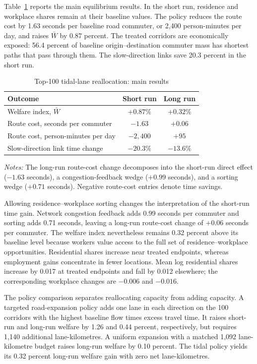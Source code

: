 \documentclass[12pt]{article}
\begin{document}
Table~\ref{tab:tidal} reports the main equilibrium results. In the short run, residence and workplace shares remain at their baseline values. The policy reduces the route cost by 1.63 seconds per baseline road commuter, or 2,400 person-minutes per day, and raises $\bar W$ by 0.87 percent. The treated corridors are economically exposed: 56.4 percent of baseline origin--destination commuter mass has shortest paths that pass through them. The slow-direction links save 20.3 percent in the short run.

\begin{table}[htbp]
\centering
\caption{Top-100 tidal-lane reallocation: main results}
\label{tab:tidal}
\begin{tabular}{lcc}
\toprule
Outcome & Short run & Long run \\
\midrule
Welfare index, $\bar W$ & $+0.87\%$ & $+0.32\%$ \\
Route cost, seconds per commuter & $-1.63$ & $+0.06$ \\
Route cost, person-minutes per day & $-2{,}400$ & $+95$ \\
Slow-direction link time change & $-20.3\%$ & $-13.6\%$ \\
\bottomrule
\end{tabular}
\begin{flushleft}\footnotesize
\emph{Notes:} The long-run route-cost change decomposes into the short-run direct effect ($-1.63$ seconds), a congestion-feedback wedge ($+0.99$ seconds), and a sorting wedge ($+0.71$ seconds). Negative route-cost entries denote time savings.
\end{flushleft}
\end{table}

Allowing residence--workplace sorting changes the interpretation of the short-run time gain. Network congestion feedback adds 0.99 seconds per commuter and sorting adds 0.71 seconds, leaving a long-run route-cost change of $+0.06$ seconds per commuter. The welfare index nevertheless remains 0.32 percent above its baseline level because workers value access to the full set of residence--workplace opportunities. Residential shares increase near treated endpoints, whereas employment gains concentrate in fewer locations. Mean log residential shares increase by 0.017 at treated endpoints and fall by 0.012 elsewhere; the corresponding workplace changes are $-0.006$ and $-0.016$.

The policy comparison separates reallocating capacity from adding capacity. A targeted road-expansion policy adds one lane in each direction on the 100 corridors with the highest baseline flow times excess travel time. It raises short-run and long-run welfare by 1.26 and 0.44 percent, respectively, but requires 1,140 additional lane-kilometres. A uniform expansion with a matched 1,092 lane-kilometre budget raises long-run welfare by 0.10 percent. The tidal policy yields its 0.32 percent long-run welfare gain with zero net lane-kilometres.
\end{document}
